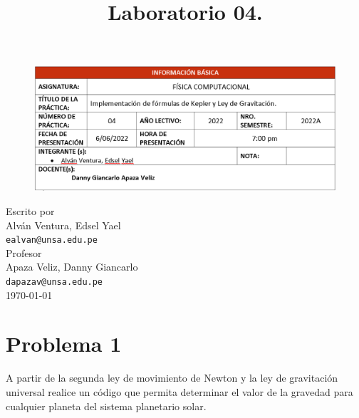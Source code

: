 \documentclass[a4paper,12pt]{article}
\begin{document}
\lstset{language=Python,frame=single, firstnumber=1,basicstyle=\footnotesize,numbers=left,showspaces=false,showstringspaces=false}    
    \begin{figure}
        \centering
        \includegraphics[scale=0.3]{tableabet}
    \end{figure}    
    
    \title{Laboratorio 04.}
    \date{\vspace{-5ex}}
    \maketitle
    \begin{center}
        Escrito por\\
        Alván Ventura, Edsel Yael\\ \texttt{ealvan@unsa.edu.pe}
        \\[3mm]
        Profesor\\Apaza Veliz, Danny Giancarlo\\ \texttt{dapazav@unsa.edu.pe}\\[3mm]
        \today
    \end{center}
    \section{Problema 1}
        A partir de la segunda ley de movimiento de Newton 
        y la ley de gravitación universal realice un código
        que permita determinar el valor de la gravedad para 
        cualquier planeta del sistema planetario solar.
\end{document}
